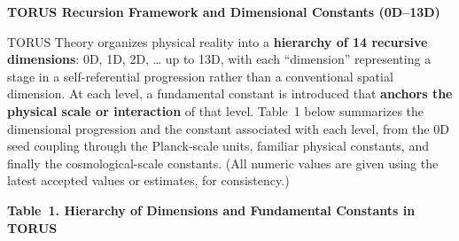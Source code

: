 \documentclass[]{article}
\begin{document}
\textbf{TORUS Recursion Framework and Dimensional Constants (0D--13D)}

TORUS Theory organizes physical reality into a \textbf{hierarchy of 14
recursive dimensions}: 0D, 1D, 2D, \ldots{} up to 13D, with each
``dimension'' representing a stage in a self-referential progression
rather than a conventional spatial dimension. At each level, a
fundamental constant is introduced that \textbf{anchors the physical
scale or interaction} of that level. Table~1 below summarizes the
dimensional progression and the constant associated with each level,
from the 0D seed coupling through the Planck-scale units, familiar
physical constants, and finally the cosmological-scale constants. (All
numeric values are given using the latest accepted values or estimates,
for consistency.)

\textbf{Table~1. Hierarchy of Dimensions and Fundamental Constants in
TORUS}
\end{document}

